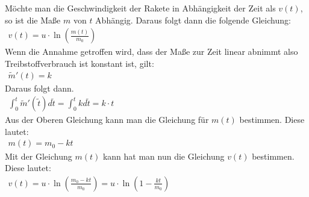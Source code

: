 \documentclass[a4paper,12pt]{article}
\begin{document}
Möchte man die Geschwindigkeit der Rakete in Abhängigkeit der Zeit als $v(t)$, so ist die Maße $m$ von $t$ Abhängig. Daraus folgt dann die folgende Gleichung:\\

$\begin{aligned}
	v(t)=u\cdot \ln\left(\frac{m(t)}{m_0}\right)
\end{aligned}$\\

Wenn die Annahme getroffen wird, dass der Maße zur Zeit linear abnimmt also Treibstoffverbrauch ist konstant ist, gilt:\\

$\begin{aligned}
	\tilde{m}'(t) = k
\end{aligned}$\\

Daraus folgt dann.\\

$\begin{aligned}
	\int_{0}^{t}\tilde{m}'(\tilde{t})d\tilde{t} = \int_{0}^{t}kd\tilde{t} = k\cdot t
\end{aligned}$\\

Aus der Oberen Gleichung kann man die Gleichung für $m(t)$ bestimmen. Diese lautet:\\

$\begin{aligned}
	m(t) = m_0 - kt
\end{aligned}$\\

Mit der Gleichung $m(t)$ kann hat man nun die Gleichung $v(t)$ bestimmen. Diese lautet:\\

$\begin{aligned}
	v(t)=u\cdot \ln\left(\frac{m_0 - kt}{m_0}\right) = u\cdot \ln\left(1 - \frac{kt}{m_0}\right)
\end{aligned}$
\end{document}
